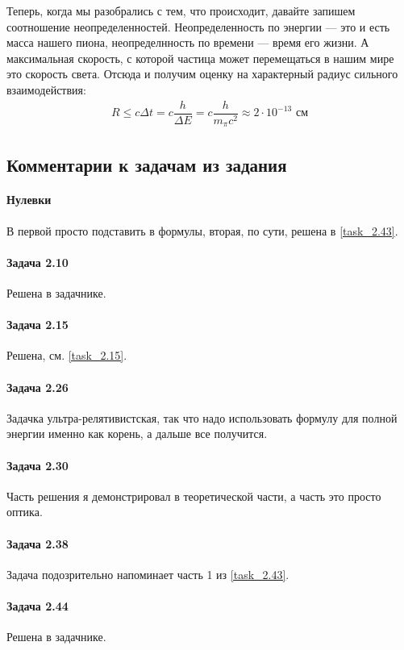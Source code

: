 \documentclass[12pt]{article}
\begin{document}
\vspace{1em} \noindent
Теперь, когда мы разобрались с тем, что происходит, давайте запишем соотношение неопределенностей. Неопределенность по энергии --- это и есть масса нашего пиона, неопределнность по времени --- время его жизни. А максимальная скорость, с которой частица может перемещаться в нашим мире это скорость света. Отсюда и получим оценку на характерный радиус сильного взаимодействия:
\begin{gather*}
    R \le c\Delta t = c\dfrac{h}{\Delta E} = c\dfrac{h}{m_{\pi}c^2}\approx 2\cdot 10^{-13} \text{ см}
\end{gather*}

\subsection{Комментарии к задачам из задания}
\paragraph{Нулевки} В первой просто подставить в формулы, вторая, по сути, решена в \ref{task_2.43}.
\paragraph{Задача 2.10} Решена в задачнике.
\paragraph{Задача 2.15} Решена, см. \ref{task_2.15}.
\paragraph{Задача 2.26} Задачка ультра-релятивистская, так что надо использовать формулу для полной энергии именно как корень, а дальше все получится.
\paragraph{Задача 2.30} Часть решения я демонстрировал в теоретической части, а часть это просто оптика.
\paragraph{Задача 2.38} Задача подозрительно напоминает часть 1 из \ref{task_2.43}.
\paragraph{Задача 2.44} Решена в задачнике.
\end{document}
